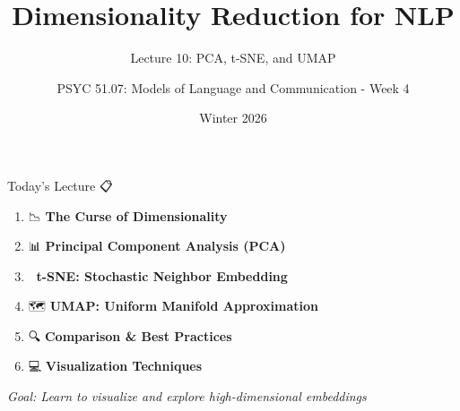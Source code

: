 \documentclass[aspectratio=169]{beamer}
\title{Dimensionality Reduction for NLP}
\subtitle{Lecture 10: PCA, t-SNE, and UMAP}
\author{PSYC 51.07: Models of Language and Communication - Week 4}
\date{Winter 2026}
\begin{document}
\begin{frame}[shrink=10]
\titlepage
\end{frame}

\begin{frame}[shrink=10]{Today's Lecture 📋}
\large
\begin{enumerate}\setlength{\itemsep}{0pt}
    \item 📉 \textbf{The Curse of Dimensionality}
    \item 📊 \textbf{Principal Component Analysis (PCA)}
    \item 🎨 \textbf{t-SNE: Stochastic Neighbor Embedding}
    \item 🗺️ \textbf{UMAP: Uniform Manifold Approximation}
    \item 🔍 \textbf{Comparison \& Best Practices}
    \item 💻 \textbf{Visualization Techniques}
\end{enumerate}

\vspace{1em}
\textit{Goal: Learn to visualize and explore high-dimensional embeddings}
\end{frame}
\end{document}
